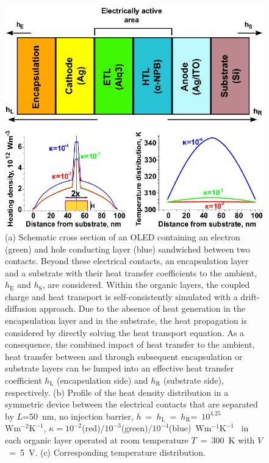 \documentclass[%
9pt,
 aip,
rsi,%
 amsmath,amssymb,
preprint,%
]{revtex4-1}
\newcommand{\thermalconductivity}{$\mathrm{W m^{-1} K^{-1}}$}
\newcommand{\hcoefficient}{$\mathrm{W m^{-2} K^{-1}}$}
\begin{document}
\begin{figure}
	\centering
    \includegraphics{General_plots_0.eps}
    \caption{(a) Schematic cross section of an OLED containing an electron (green) and hole conducting layer (blue) sandwiched between two contacts. 
    Beyond these electrical contacts, an encapsulation layer and a substrate with their heat transfer coefficients to the ambient, $h_{\mathrm{E}}$ and $h_{\mathrm{S}}$, are considered. 
    Within the organic layers, the coupled charge and heat transport is self-consistently simulated with a drift-diffusion approach. 
    Due to the absence of heat generation in the encapsulation layer and in the substrate, the heat propagation is considered by directly solving the heat transport equation. 
    As a consequence, the combined impact of heat transfer to the ambient, heat transfer between and through subsequent encapsulation or substrate layers can be lumped into an effective heat transfer coefficient %
    $h_{\mathrm{L}}$ (encapsulation side) and $h_{\mathrm{R}}$ (substrate side), respectively.
    (b) Profile of the heat density distribution in a symmetric device between the electrical contacts that are separated by $L$=50~nm, no injection barrier, $h$~=~$h_{\mathrm{L}}$~=~$h_{\mathrm{R}}$=~$10^{4.25}$~\hcoefficient, $\kappa=10^{-2}$(red)/$10^{-3}$(green)/$10^{-4}$(blue)~\thermalconductivity~ in each organic layer operated at room temperature $T$~=~300~K with $V$~=~5~V. 
    (c) Corresponding temperature distribution.}
\label{fig:setup}
\end{figure}
\end{document}

